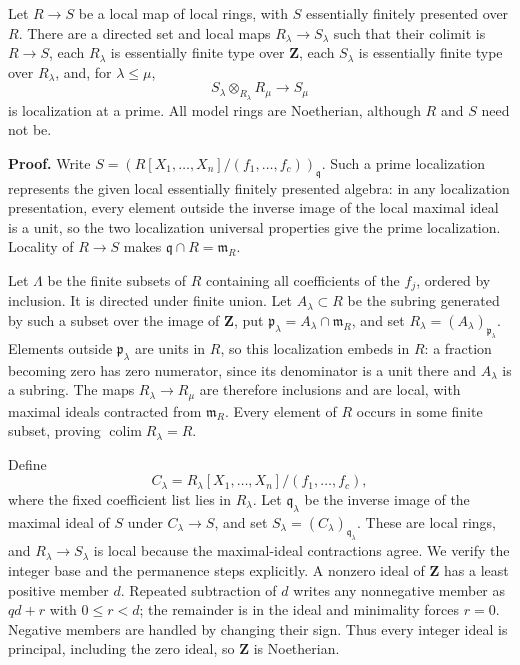 \documentclass[11pt,a4paper,openany]{report}
\begin{document}
Let \(R\to S\) be a local map of local rings, with \(S\) essentially finitely presented over \(R\). There are a directed set and local maps \(R_\lambda\to S_\lambda\) such that their colimit is \(R\to S\), each \(R_\lambda\) is essentially finite type over \(\mathbf Z\), each \(S_\lambda\) is essentially finite type over \(R_\lambda\), and, for \(\lambda\leq\mu\), \[S_\lambda\otimes_{R_\lambda}R_\mu\longrightarrow S_\mu\] is localization at a prime. All model rings are Noetherian, although \(R\) and \(S\) need not be.

\textbf{Proof.} Write \(S=(R[X_1,\ldots,X_n]/(f_1,\ldots,f_c))_{\mathfrak q}\). Such a prime localization represents the given local essentially finitely presented algebra: in any localization presentation, every element outside the inverse image of the local maximal ideal is a unit, so the two localization universal properties give the prime localization. Locality of \(R\to S\) makes \(\mathfrak q\cap R=\mathfrak m_R\).

Let \(\Lambda\) be the finite subsets of \(R\) containing all coefficients of the \(f_j\), ordered by inclusion. It is directed under finite union. Let \(A_\lambda\subset R\) be the subring generated by such a subset over the image of \(\mathbf Z\), put \(\mathfrak p_\lambda=A_\lambda\cap\mathfrak m_R\), and set \(R_\lambda=(A_\lambda)_{\mathfrak p_\lambda}\). Elements outside \(\mathfrak p_\lambda\) are units in \(R\), so this localization embeds in \(R\): a fraction becoming zero has zero numerator, since its denominator is a unit there and \(A_\lambda\) is a subring. The maps \(R_\lambda\to R_\mu\) are therefore inclusions and are local, with maximal ideals contracted from \(\mathfrak m_R\). Every element of \(R\) occurs in some finite subset, proving \(\operatorname*{colim}R_\lambda=R\).

Define \[C_\lambda=R_\lambda[X_1,\ldots,X_n]/(f_1,\ldots,f_c),\] where the fixed coefficient list lies in \(R_\lambda\). Let \(\mathfrak q_\lambda\) be the inverse image of the maximal ideal of \(S\) under \(C_\lambda\to S\), and set \(S_\lambda=(C_\lambda)_{\mathfrak q_\lambda}\). These are local rings, and \(R_\lambda\to S_\lambda\) is local because the maximal-ideal contractions agree. We verify the integer base and the permanence steps explicitly. A nonzero ideal of \(\mathbf Z\) has a least positive member \(d\). Repeated subtraction of \(d\) writes any nonnegative member as \(qd+r\) with \(0\le r<d\); the remainder is in the ideal and minimality forces \(r=0\). Negative members are handled by changing their sign. Thus every integer ideal is principal, including the zero ideal, so \(\mathbf Z\) is Noetherian.
\end{document}
